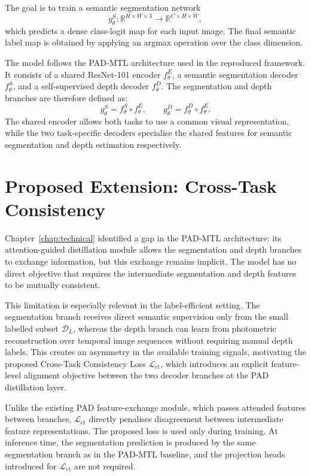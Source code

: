 The goal is to train a semantic segmentation network
\[
    g_\theta^S \colon \mathbb{R}^{H \times W \times 3}
    \to \mathbb{R}^{C \times H \times W},
\]
which predicts a dense class-logit map for each input image. The final
semantic label map is obtained by applying an argmax operation over the
class dimension.

The model follows the PAD-MTL architecture used in the reproduced
framework. It consists of a shared ResNet-101 encoder $f_\theta^E$, a
semantic segmentation decoder $f_\theta^S$, and a self-supervised depth
decoder $f_\theta^D$. The segmentation and depth branches are therefore
defined as:
\[
    g_\theta^S = f_\theta^S \circ f_\theta^E,
    \qquad
    g_\theta^D = f_\theta^D \circ f_\theta^E.
\]
The shared encoder allows both tasks to use a common visual representation,
while the two task-specific decoders specialise the shared features for
semantic segmentation and depth estimation respectively.

\section{Proposed Extension: Cross-Task Consistency}
\label{sec:proposed-extension}

Chapter~\ref{chap:technical} identified a gap in the PAD-MTL architecture:
its attention-guided distillation module allows the segmentation and depth
branches to exchange information, but this exchange remains implicit. The
model has no direct objective that requires the intermediate segmentation
and depth features to be mutually consistent.

This limitation is especially relevant in the label-efficient setting. The
segmentation branch receives direct semantic supervision only from the
small labelled subset $\mathcal{D}_L$, whereas the depth branch can learn
from photometric reconstruction over temporal image sequences without
requiring manual depth labels. This creates an asymmetry in the available training
signals, motivating the proposed Cross-Task Consistency Loss
$\mathcal{L}_\text{ct}$, which introduces an explicit feature-level
alignment objective between the two decoder branches at the PAD
distillation layer.

Unlike the existing PAD feature-exchange module, which passes attended
features between branches, $\mathcal{L}_\text{ct}$ directly penalises
disagreement between intermediate feature representations. The proposed
loss is used only during training. At inference time, the segmentation
prediction is produced by the same segmentation branch as in the PAD-MTL
baseline, and the projection heads introduced for $\mathcal{L}_\text{ct}$
are not required.

